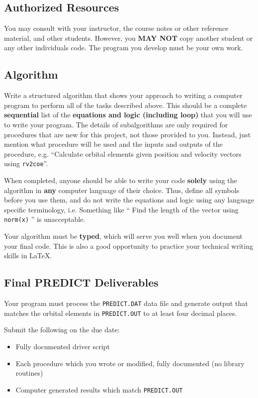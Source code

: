 \documentclass[11pt, reqno]{article}    %
\begin{document}
\subsection*{Authorized Resources}
You may consult with your instructor, the course notes or other reference material, and other students. 
However, you \textbf{MAY NOT} copy another student or any other individuals code. 
The program you develop must be your own work.

\subsection*{Algorithm}

Write a structured algorithm that shows your approach to writing a computer program to perform all of the tasks described above.
This should be a complete \textbf{sequential} list of the \textbf{equations and logic (including loop)} that you will use to write your program.
The details of subalgorithms are only required for procedures that are new for this project, not those provided to you.
Instead, just mention what procedure will be used and the inputs and outputs of the procedure, e.g. ``Calculate orbital elements given position and velocity vectors using \texttt{rv2coe}''.

When completed, anyone should be able to write your code \textbf{solely} using the algorithm in \textbf{any} computer language of their choice.
Thus, define all symbols before you use them, and do not write the equations and logic using any language specific terminology, i.e. Something like `` Find the length of the vector using \texttt{norm(x)} '' is unacceptable.

Your algorithm must be \textbf{typed}, which will serve you well when you document your final code. 
This is also a good opportunity to practice your technical writing skills in \LaTeX.

\subsection*{Final PREDICT Deliverables}

Your program must process the \texttt{PREDICT.DAT} data file and generate output that matches the orbital elements in \texttt{PREDICT.OUT} to at least four decimal places. 

Submit the following on the due date:
\begin{itemize}
    \item Fully documented driver script
    \item Each procedure which you wrote or modified, fully documented (no library routines)
    \item Computer generated results which match \texttt{PREDICT.OUT}
\end{itemize}
\end{document}
